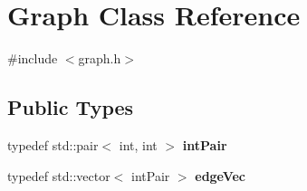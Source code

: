 \hypertarget{class_graph}{}\section{Graph Class Reference}
\label{class_graph}


{\ttfamily \#include $<$graph.\+h$>$}

\subsection*{Public Types}
\begin{DoxyCompactItemize}
\item 
\mbox{\label{class_graph_a312cc4a3709948724eaf91daf6e6a26b}} 
typedef std\+::pair$<$ int, int $>$ {\bfseries int\+Pair}
\item 
\mbox{\label{class_graph_acd347d927aa7a1e732e68e1268ba329e}} 
typedef std\+::vector$<$ int\+Pair $>$ {\bfseries edge\+Vec}
\end{DoxyCompactItemize}
